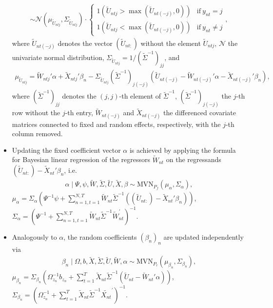 \documentclass[article,shortnames]{jss}
\begin{document}
\begin{itemize}
\begin{align*}
  \sim \mathcal{N}(\mu_{\tilde{U}_{ntj}},\Sigma_{\tilde{U}_{ntj}}) \cdot \begin{cases}
  1(\tilde{U}_{ntj}>\max(\tilde{U}_{nt(-j)},0) ) & \text{if}~ y_{nt}=j\\
  1(\tilde{U}_{ntj}<\max(\tilde{U}_{nt(-j)},0) ) & \text{if}~ y_{nt}\neq j
  \end{cases},
  \end{align*}
  where $\tilde{U}_{nt(-j)}$ denotes the vector $(\tilde{U}_{nt:})$ without the element $\tilde{U}_{ntj}$, $\mathcal{N}$ the univariate normal distribution, $\Sigma_{\tilde{U}_{ntj}} = 1/(\tilde{\Sigma}^{-1})_{jj}$, and
  \begin{align*}
  \mu_{\tilde{U}_{ntj}} = \tilde{W}_{ntj}'\alpha + \tilde{X}_{ntj}'\beta_n - \Sigma_{\tilde{U}_{ntj}} (\tilde{\Sigma}^{-1})_{j(-j)}   (\tilde{U}_{nt(-j)} - \tilde{W}_{nt(-j)}'\alpha - \tilde{X}_{nt(-j)}' \beta_n ),
  \end{align*}
  where $(\tilde{\Sigma}^{-1})_{jj}$ denotes the $(j,j)$-th element of $\tilde{\Sigma}^{-1}$, $(\tilde{\Sigma}^{-1})_{j(-j)}$ the $j$-th row without the $j$-th entry, $\tilde{W}_{nt(-j)}$ and $\tilde{X}_{nt(-j)}$ the differenced covariate matrices connected to fixed and random effects, respectively, with the $j$-th column removed.
  \item Updating the fixed coefficient vector $\alpha$ is achieved by applying the formula for Bayesian linear regression of the regressors $\tilde{W}_{nt}$ on the regressands $(\tilde{U}_{nt:})-\tilde{X}_{nt}'\beta_n$, i.e.\
  \begin{align*}
  \alpha \mid \Psi,\psi,\tilde{W},\tilde{\Sigma},\tilde{U},\tilde{X},\beta \sim \text{MVN}_{P_f}(\mu_\alpha,\Sigma_\alpha),
  \end{align*}
  $\mu_\alpha = \Sigma_\alpha (\Psi^{-1}\psi + \sum_{n=1,t=1}^{N,T} \tilde{W}_{nt} \tilde{\Sigma}^{-1} ((\tilde{U}_{nt:})-\tilde{X}_{nt}'\beta_n) )$, $\Sigma_\alpha = (\Psi^{-1} + \sum_{n=1,t=1}^{N,T} \tilde{W}_{nt}\tilde{\Sigma}^{-1} \tilde{W}_{nt}^{'} )^{-1}$.
  \item Analogously to $\alpha$, the random coefficients $(\beta_n)_n$ are updated independently via
  \begin{align*}
  \beta_n \mid \Omega,b,\tilde{X},\tilde{\Sigma},\tilde{U},\tilde{W},\alpha \sim \text{MVN}_{P_r}(\mu_{\beta_n},\Sigma_{\beta_n}),
  \end{align*}
  $\mu_{\beta_n} = \Sigma_{\beta_n} (\Omega_{z_n}^{-1}b_{z_n} + \sum_{t=1}^{T} \tilde{X}_{nt} \tilde{\Sigma}^{-1} (\tilde{U}_{nt}-\tilde{W}_{nt}'\alpha) )$, $\Sigma_{\beta_n} = (\Omega_{z_n}^{-1} + \sum_{t=1}^{T} \tilde{X}_{nt}\tilde{\Sigma}^{-1} \tilde{X_{nt}}^{'} )^{-1}$.

\end{itemize}
\end{document}
